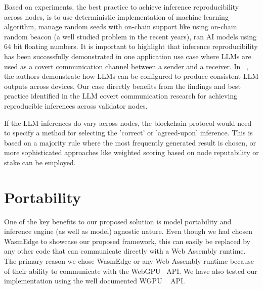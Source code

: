Based on experiments, the best practice to achieve inference reproducibility across nodes, is to use deterministic implementation of machine learning algorithm, manage random seeds with on-chain support like using on-chain random beacon (a well studied problem in the recent years), ran AI models using 64 bit floating numbers.  It is important to highlight that inference reproducibility has been successfully demonstrated in one application use case where LLMs are used as a covert communication channel between a sender and a receiver. In ~\cite{bauercodaspy}, the authors demonstrate how LLMs can be configured to produce consistent LLM outputs across devices. Our case directly benefits from the findings and best practice identified in the LLM covert communication research for achieving reproducible inferences across validator nodes.  

If the LLM inferences do vary across nodes, the blockchain protocol would need to specify a method for selecting the 'correct' or 'agreed-upon' inference. This is based on a majority rule where the most frequently generated result is chosen, or more sophisticated approaches like weighted scoring based on node reputability or stake can be employed.



\section{Portability}
One of the key benefits to our proposed solution is model portability and inference engine (as well as model) agnostic nature. Even though we had chosen WasmEdge to showcase our proposed framework, this can easily be replaced by any other code that can communicate directly with a Web Assembly runtime. The primary reason we chose WasmEdge or any Web Assembly runtime because of their ability to communicate with the WebGPU~\cite{kenwright2022introduction} API. We have also tested our implementation using the well documented WGPU ~\cite{wgpu} API.

